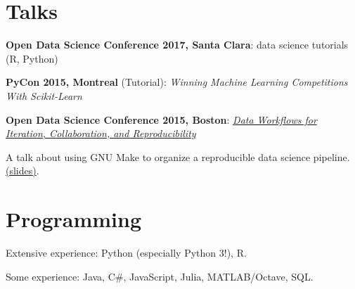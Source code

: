 \documentclass[letterpaper]{resume}
\begin{document}
\section{Talks}

\begin{compactitem}
\item \textbf{Open Data Science Conference 2017, Santa Clara}: data science tutorials (R, Python)
\item \textbf{PyCon 2015, Montreal} (Tutorial): \textit{Winning Machine Learning Competitions With Scikit-Learn}
\item \textbf{Open Data Science Conference 2015, Boston}: \textit{\href{http://opendatascicon.com/schedule/data-workflows-for-iteration-collaboration-and-reproducibility/}{Data Workflows for Iteration, Collaboration, and Reproducibility}}
\begin{compactitem}
\item A talk about using GNU Make to organize a reproducible data science pipeline. \href{http://www.davidchudzicki.com/slides/odsc-2015-workflow/}{(slides)}.
\end{compactitem}
\end{compactitem}


\section{Programming}
\vspace{1pt}
\begin{compactitem}
\item Extensive experience: Python (especially Python 3!), R.
\item Some experience: Java, C\#, JavaScript, Julia, MATLAB/Octave, SQL.
\end{compactitem}
\end{document}
